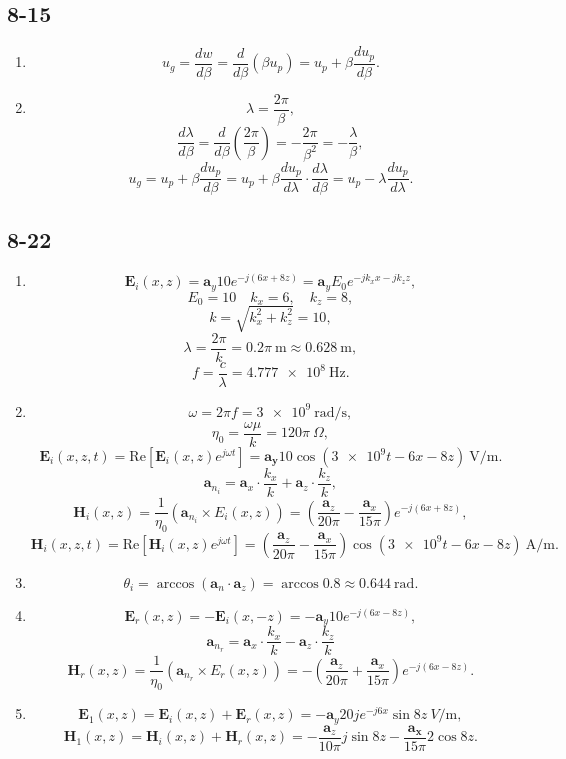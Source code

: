 \documentclass[6pt,a4paper]{article}
\begin{document}
\subsection{8-15}
\begin{enumerate}[label=\alph*)]
\item
$$u_g=\frac{dw}{d\beta}=\frac{d}{d\beta}(\beta u_p)=u_p+\beta\frac{du_p}{d\beta}.$$
\item
$$\lambda=\frac{2\pi}{\beta},$$
$$\frac{d\lambda}{d\beta}=\frac{d}{d\beta}\left(\frac{2\pi}{\beta}\right)=-\frac{2\pi}{\beta^2}=-\frac{\lambda}{\beta},$$
$$u_g=u_p+\beta\frac{du_p}{d\beta}=u_p+\beta\frac{du_p}{d\lambda}\cdot\frac{d\lambda}{d\beta}=u_p-\lambda\frac{du_p}{d\lambda}.$$
\end{enumerate}

\subsection{8-22}

\begin{enumerate}[label=\alph*)]
\item
$$\mathbf{E}_i(x,z)=\mathbf{a}_y10e^{-j(6x+8z)}=\mathbf{a}_yE_0e^{-jk_xx-jk_zz},$$
$$E_0=10\quad k_x=6,\quad k_z=8,$$
$$k=\sqrt{k_x^2+k_z^2}=10,$$
$$\lambda=\frac{2\pi}{k}=0.2\pi~\si{\m}\approx\SI{0.628}{\m},$$
$$f=\frac{c}{\lambda}=\SI{4.777e8}{\Hz}.$$
\item
$$\omega=2\pi f=\SI{3e9}{\radian\per\s},$$
$$\eta_0=\frac{\omega\mu}{k}=120\pi~\Omega,$$
$$\mathbf{E}_i(x,z,t)=\text{Re}[\mathbf{E}_i(x,z)e^{j\omega t}]=\mathbf{a_y}10\cos(\num{3e9}t-6x-8z)~\si{\V\per\m}.$$
$$\mathbf{a}_{n_i}=\mathbf{a}_x\cdot\frac{k_x}{k}+\mathbf{a}_z\cdot\frac{k_z}{k},$$
$$\mathbf{H}_i(x,z)=\frac{1}{\eta_0}(\mathbf{a}_{n_i}\times E_i(x,z))=\left(\frac{\mathbf{a}_z}{20\pi}-\frac{\mathbf{a}_x}{15\pi}\right)e^{-j(6x+8z)},$$
$$\mathbf{H}_i(x,z,t)=\text{Re}[\mathbf{H}_i(x,z)e^{j\omega t}]=\left(\frac{\mathbf{a}_z}{20\pi}-\frac{\mathbf{a}_x}{15\pi}\right)\cos(\num{3e9}t-6x-8z)~\si{\A\per\m}.$$
\item
$$\theta_i=\arccos(\mathbf{a}_n\cdot\mathbf{a}_z)=\arccos0.8\approx0.644~\si{\radian}.$$
\item
$$\mathbf{E}_r(x,z)=-\mathbf{E}_i(x,-z)=-\mathbf{a}_y10e^{-j(6x-8z)},$$
$$\mathbf{a}_{n_r}=\mathbf{a}_x\cdot\frac{k_x}{k}-\mathbf{a}_z\cdot\frac{k_z}{k}$$
$$\mathbf{H}_r(x,z)=\frac{1}{\eta_0}(\mathbf{a}_{n_r}\times E_r(x,z))=-\left(\frac{\mathbf{a}_z}{20\pi}+\frac{\mathbf{a}_x}{15\pi}\right)e^{-j(6x-8z)}.$$
\item
$$\mathbf{E}_1(x,z)=\mathbf{E}_i(x,z)+\mathbf{E}_r(x,z)=-\mathbf{a}_y20je^{-j6x}\sin8z~\si{V\per\m},$$
$$\mathbf{H}_1(x,z)=\mathbf{H}_i(x,z)+\mathbf{H}_r(x,z)=-\frac{\mathbf{a}_z}{10\pi}j\sin8z-\frac{\mathbf{a_x}}{15\pi}2\cos8z.$$
\end{enumerate}
\end{document}
